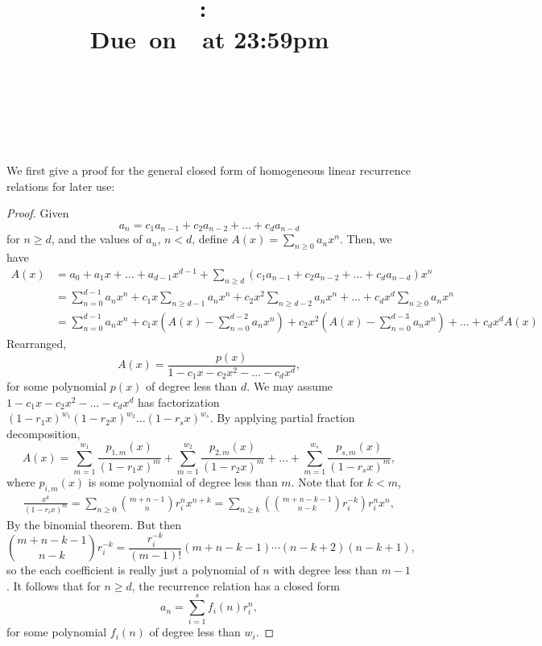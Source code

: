 \documentclass{article}
\title{
    \vspace{2in}
    \textmd{\textbf{\hmwkClass:\ \hmwkTitle}}\\
    \normalsize\vspace{0.1in}\small{Due\ on\ \hmwkDueDate\ at 23:59pm}\\
    \vspace{0.1in}\large{\textit{\hmwkClassInstructor}} \\
    \vspace{3in}
}
\author{
  \hmwkAuthorName \\
  \vspace{0.1in}\small\hmwkPID
}
\date{}
\begin{document}
\maketitle

\pagebreak

We first give a proof for the general closed form of homogeneous linear recurrence relations for
later use: 
\begin{proof}
  Given 
  \[
    a_n = c_1a_{n - 1} + c_2a_{n - 2} + \dots + c_da_{n - d}
  \]
  for $n \geq d$, and the values of $a_n$, $n < d$, define $A(x) = \sum\limits_{n \geq 0} a_nx^n$.
  Then, we have 
  \begin{align*}
    A(x) 
    &= a_0 + a_1x + \dots + a_{d - 1}x^{d - 1} + \sum_{n \geq d} (c_1a_{n - 1} + c_2a_{n - 2} + \dots + c_da_{n - d})x^n \\
    &= \sum_{n = 0}^{d - 1} a_nx^n + c_1x\sum_{n \geq d - 1} a_{n}x^n + c_2x^2\sum_{n \geq d - 2} a_{n}x^n + \dots + c_dx^d\sum_{n \geq 0} a_{n}x^n \\
    &= \sum_{n = 0}^{d - 1} a_nx^n + c_1x\left(A(x) - \sum_{n = 0}^{d - 2} a_nx^n\right) + c_2x^2\left(A(x) - \sum_{n = 0}^{d - 3} a_nx^n\right) + \dots + c_dx^dA(x)
  \end{align*}
  Rearranged,
  \[
    A(x) = \frac{p(x)}{1 - c_1x - c_2x^2 - \dots - c_dx^d},
    \]
  for some polynomial $p(x)$ of degree less than $d$. We may assume $1 - c_1x - c_2x^2 - \dots -
  c_dx^d$ has factorization $(1 - r_1x)^{w_1}(1 - r_2x)^{w_2} \dots (1 - r_sx)^{w_s}$. By applying
  partial fraction decomposition,
  \[
    A(x) = \sum_{m = 1}^{w_1} \frac{p_{1, m}(x)}{(1 - r_1x)^m} + \sum_{m = 1}^{w_2} \frac{p_{2, m}(x)}{(1 - r_2x)^m} + \dots + \sum_{m = 1}^{w_s} \frac{p_{s, m}(x)}{(1 - r_sx)^m},
  \]
  where $p_{i, m}(x)$ is some polynomial of degree less than $m$. Note that for $k < m$,
  \begin{gather*}
    \frac{x^k}{(1 - r_ix)^m} = \sum_{n \geq 0} {m + n - 1 \choose n}r_i^nx^{n + k} = \sum_{n \geq k} \left({m + n - k - 1 \choose n - k}r_i^{-k}\right)r_i^{n}x^{n},
  \end{gather*}
  By the binomial theorem. But then
  \[
    {m + n - k - 1 \choose n - k}r_i^{-k} = \frac{r_i^{-k}}{(m - 1)!}(m + n - k - 1) \cdots (n - k + 2)(n - k + 1),
  \]
  so the each coefficient is really just a polynomial of $n$ with degree less than $m - 1$. It
  follows that for $n \geq d$, the recurrence relation has a closed form 
  \[
    a_n = \sum_{i = 1}^s f_i(n)r_i^n,
  \]
  for some polynomial $f_i(n)$ of degree less than $w_i$.
\end{proof}
\end{document}
